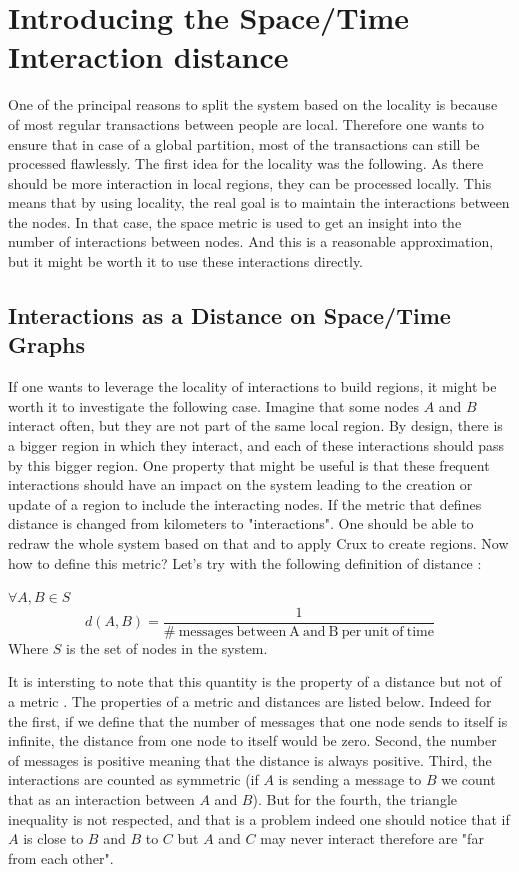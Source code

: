 \documentclass[a4paper,11pt,twoside,openright]{report}
\begin{document}
\section{Introducing the Space/Time Interaction distance}
One of the principal reasons to split the system based on the locality is
because of most regular transactions between people are local. Therefore one
wants to ensure that in case of a global partition, most of the transactions
can still be processed flawlessly. The first idea for the locality was the
following. As there should be more interaction in local regions, they can be processed locally. This means that by using locality, the
real goal is to maintain the interactions between the nodes. In that case,
the space metric is used to get an insight into the number of interactions
between nodes. And this is a reasonable approximation, but it might be worth it
to use these interactions directly. 

\subsection{Interactions as a Distance on Space/Time Graphs}

If one wants to leverage the locality of interactions to build regions, it
might be worth it to investigate the following case. Imagine that some nodes
$A$ and $B$ interact often, but they are not part of the same local
region. By design, there is a bigger region in which they interact, and each of
these interactions should pass by this bigger region. One property that might
be useful is that these frequent interactions should have an impact on the
system leading to the creation or update of a region to include the interacting nodes. If the
metric that defines distance is changed from kilometers to "interactions". One
should be able to redraw the whole system based on that and to apply Crux to
create regions. Now how to define this metric? Let's try with the
following definition of distance :


$\forall A, B \in S$
\begin{equation} \label{definition-distance}
 d(A,B) = \frac{1}{ \mathrm{\#\ messages\ between\ A\ and\ B\ per\ unit\ of\ time} } 
\end{equation}
Where $S$ is the set of nodes in the system.

It is intersting to note that this quantity is the property of a distance but not of a metric
\cite{Greenhoe2016}. The properties of a metric and distances are listed below.
Indeed for the first, if we define that the number of messages that one node
sends to itself is infinite, the distance from one node to itself would be
zero. Second, the number of messages is positive meaning that the distance is always positive. Third, the interactions are counted as symmetric (if $A$ is
sending a message to $B$ we count that as an interaction between $A$ and $B$).
But for the fourth, the triangle inequality is not respected, and that is a
problem indeed one should notice that if $A$ is close to $B$ and $B$ to $C$ but
$A$ and $C$ may never interact therefore are "far from each other".  
\end{document}
